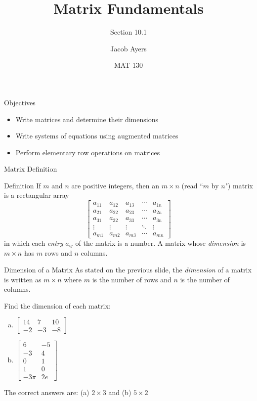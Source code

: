 \documentclass[t, aspectratio=169]{beamer}
\title[Abbr]{Matrix Fundamentals}
\subtitle{Section 10.1}
\author{Jacob Ayers}
\institute{Lesson \#24}
\date{MAT 130}
\begin{document}
	
	\begin{frame}
		\titlepage
	\end{frame}
	
	\begin{frame}{Objectives}
		\begin{itemize}
			\item Write matrices and determine their dimensions
			\item Write systems of equations using augmented matrices
			\item Perform elementary row operations on matrices
		\end{itemize}
	\end{frame}

	\begin{frame}{Matrix Definition}
		\begin{block}{Definition}
			If $m$ and $n$ are positive integers, then an $m \times n$ (read ``$m$ by $n$") matrix is a rectangular array $$\begin{bmatrix}
			a_{11} & a_{12} & a_{13} & \cdots & a_{1n} \\
			a_{21} & a_{22} & a_{23} & \cdots & a_{2n} \\
			a_{31} & a_{32} & a_{33} & \cdots & a_{3n} \\
			\vdots & \vdots & \vdots & \ddots & \vdots \\
			a_{m1} & a_{m2} & a_{m3} & \cdots & a_{mn}
			\end{bmatrix}$$ in which each \textit{entry} $a_{ij}$ of the matrix is a number. A matrix whose \textit{dimension} is $m\times n$ has $m$ rows and $n$ columns.
		\end{block}
	\end{frame}
	\begin{frame}{Dimension of a Matrix}
		As stated on the previous slide, the \textit{dimension} of a matrix is written as $m \times n$ where $m$ is the number of rows and $n$ is the number of columns. \pause
		
		Find the dimension of each matrix: \begin{enumerate}[(a)]
			\item $\begin{bmatrix}
			14 & 7 & 10 \\ -2 & -3 & -8
			\end{bmatrix}$
			\item $\begin{bmatrix}
			6 & -5 \\ -3 & 4 \\ 0 & 1 \\ 1 & 0 \\ -3\pi & 2e
			\end{bmatrix}$
		\end{enumerate} \pause
	
		The correct answers are: (a) $2 \times 3$ and (b) $5 \times 2$
	\end{frame}
\end{document}
